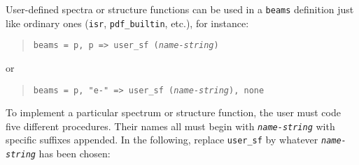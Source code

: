 \documentclass[12pt]{book}
\newcommand{\ttt}[1]{\texttt{#1}}
\begin{document}
User-defined spectra or structure functions can be used in a
\ttt{beams} definition just like ordinary ones (\ttt{isr},
\ttt{pdf\_builtin}, etc.), for instance:
\begin{quote}
\begin{footnotesize}
  \ttt{beams = p, p => user\_sf (\emph{name-string})}
\end{footnotesize}
\end{quote}
or
\begin{quote}
\begin{footnotesize}
  \ttt{beams = p, "e-" => user\_sf (\emph{name-string}), none}
\end{footnotesize}
\end{quote}
To implement a particular spectrum or structure function, the user
must code five different procedures.  Their names all must begin with
\ttt{\emph{name-string}} with specific suffixes appended.  In the
following, replace \ttt{user\_sf} by whatever \ttt{\emph{name-string}}
has been chosen:
\end{document}
